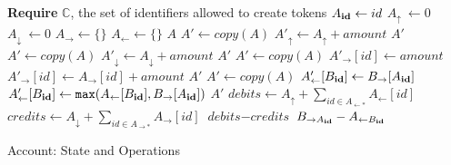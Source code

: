 \documentclass[9pt, oneside]{article}   	%
\begin{document}
\begin{algorithm}
\begin{algorithmic}[1]
   \State \textbf{Require} $\mathds{C}$, the set of identifiers allowed to create tokens
   \State
    	\State $A_{\scriptsize\textbf{id}} \leftarrow id$
	\State $A_\uparrow ~\leftarrow 0$       
	\State $A_\downarrow ~\leftarrow 0$   
	\State $A_\rightarrow \leftarrow \{ \}$ 
	\State $A_\leftarrow \leftarrow \{ \}$ 
    	\State \Return $A$
    \EndFunction
    \State
        \State $A' \leftarrow \textit{copy}(A)$ 
		 \State $A'_\uparrow \leftarrow A_\uparrow + \textit{amount}$ 
	\EndIf
	\State \Return $A'$
    \EndFunction
    \State
        \State $A' \leftarrow \textit{copy}(A)$
    	 \label{ln:burn-balance-check}
		 \State $A'_\downarrow \leftarrow A_\downarrow + \textit{amount}$ 
	\EndIf
	\State \Return $A'$
    \EndFunction
    \State
        \State $A' \leftarrow \textit{copy}(A)$
    	  \label{ln:give-balance-check}
			\State $A'_{\rightarrow}[id] \leftarrow \textit{amount}$ 
		\Else
		         \State $A'_{\rightarrow}[id] \leftarrow A_{\rightarrow}[id] + \textit{amount}$ 
		\EndIf
	\EndIf
	\State \Return $A'$
    \EndFunction
    \State
        \State $A' \leftarrow \textit{copy}(A)$
			 \State $A'_{\leftarrow}[B_{\scriptsize\textbf{id}}] \leftarrow B_{\rightarrow}[A_{\scriptsize\textbf{id}}]$
		\Else
			 \State $A'_{\leftarrow}[B_{\scriptsize\textbf{id}}] \leftarrow \texttt{max}(A_{\leftarrow}[B_{\scriptsize\textbf{id}}], B_{\rightarrow}[A_{\scriptsize\textbf{id}}])$ 
		\EndIf
        \EndIf
	\State \Return $A'$
    \EndFunction
    \State
        \State $\textit{debits} \leftarrow A_\uparrow + \sum\limits_{id \in A_{\leftarrow *}} A_{\leftarrow}[id]$ 
        \State $\textit{credits} \leftarrow A_\downarrow + \sum\limits_{id \in A_{\rightarrow *}} A_{\rightarrow}[id]$
        \State \Return $\textit{debits} - \textit{credits}$
    \EndFunction
    \State
        \State \Return $B_{\rightarrow A_{\tiny\textbf{id}}} - A_{\leftarrow B_{\tiny\textbf{id}}}$
    \EndFunction
    \end{algorithmic}
\caption{\label{alg:account} Account: State and Operations}
\end{algorithm}
\end{document}
